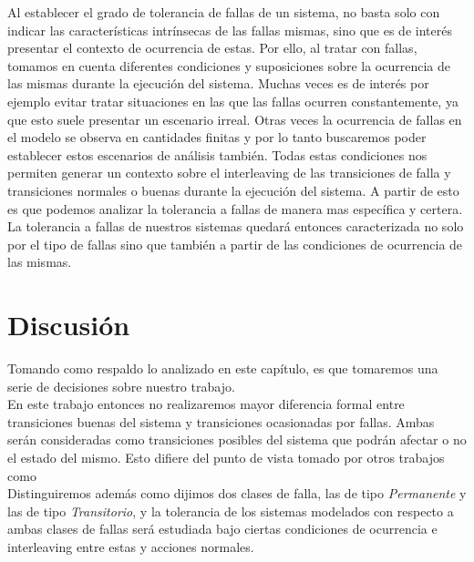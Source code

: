 \documentclass[titlepage, 12pt]{book}
\begin{document}
Al establecer el grado de tolerancia de fallas de un sistema, no basta solo con indicar las caracter\'isticas intr\'insecas de las fallas mismas, sino que es de inter\'es presentar el contexto de ocurrencia de estas. Por ello, al tratar con fallas, tomamos en cuenta diferentes condiciones y suposiciones sobre la ocurrencia de las mismas durante la ejecuci\'on del sistema. Muchas veces es de inter\'es por ejemplo evitar tratar situaciones en las que las fallas ocurren constantemente, ya que esto suele presentar un escenario irreal. Otras veces la ocurrencia de fallas en el modelo se observa en cantidades finitas y por lo tanto buscaremos poder establecer estos escenarios de an\'alisis tambi\'en. Todas estas condiciones nos permiten generar un contexto sobre el interleaving de las transiciones de falla y transiciones normales o buenas durante la ejecuci\'on del sistema. A partir de esto es que podemos analizar la tolerancia a fallas de manera mas espec\'ifica y certera. La tolerancia a fallas de nuestros sistemas quedar\'a entonces caracterizada no solo por el tipo de fallas sino que tambi\'en a partir de las condiciones de ocurrencia de las mismas.






\section{Discusi\'on}
Tomando como respaldo lo analizado en este cap\'itulo, es que tomaremos una serie de decisiones sobre nuestro trabajo.\\

En este trabajo entonces no realizaremos mayor diferencia formal entre transiciones buenas del sistema y transiciones ocasionadas por fallas. Ambas ser\'an consideradas como transiciones posibles del sistema que podr\'an afectar o no el estado del mismo. Esto difiere del punto de vista tomado por otros trabajos como \cite[etc...]{Arora,dCTL}\\

Distinguiremos adem\'as como dijimos dos clases de falla, las de tipo \textit{Permanente} y las de tipo \textit{Transitorio}, y la tolerancia de los sistemas modelados con respecto a ambas clases de fallas ser\'a estudiada bajo ciertas condiciones de ocurrencia e interleaving entre estas y acciones normales.\\
\end{document}
